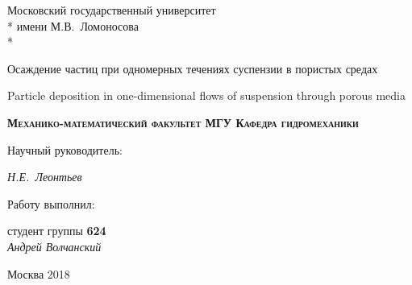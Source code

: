 \begin{titlepage}
\newpage

\begin{center}
\vspace{1.5cm}
Московский государственный университет \\*
имени М.В.~Ломоносова \\*
\hrulefill
\end{center}


\vspace{7em}

\begin{center}
\Large Осаждение частиц при одномерных течениях суспензии в пористых средах
\end{center}

\vspace{1em}

\begin{center}
\Large Particle deposition in one-dimensional flows of suspension through porous media
\end{center}

\vspace{2.5em}

\begin{center}
\textsc{\textbf{Механико-математический факультет МГУ \linebreak Кафедра гидромеханики}}
\end{center}

\vspace{3.5em}

\begin{flushright}
Научный руководитель:
\end{flushright}

\begin{flushright}
\large \textit{Н.Е.~Леонтьев}
\end{flushright}

\begin{flushright}
Работу выполнил:
\end{flushright}

\begin{flushright}
студент группы \textbf{624}\\
\vspace{1em}
\large \textit{Андрей Волчанский}\\
\end{flushright}

\vspace{\fill}

\begin{center}
Москва 2018
\end{center}

\end{titlepage}